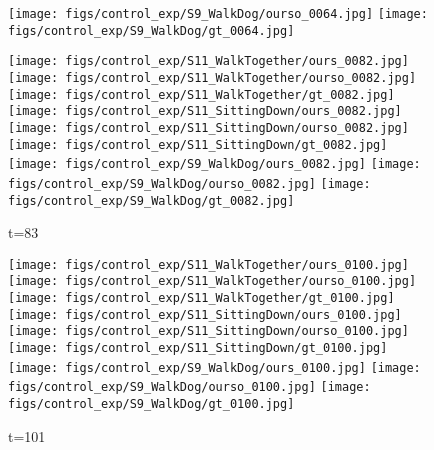 \documentclass{article}
\begin{document}
\begin{appendix}
\begin{figure*}[!thbp]
\begin{subfigure}{0.12\linewidth}
  		\texttt{[image: figs/control\_exp/S9\_WalkDog/ourso\_0064.jpg]}
  		\vspace{.2cm}
  		\texttt{[image: figs/control\_exp/S9\_WalkDog/gt\_0064.jpg]}
	\end{subfigure}
	\begin{subfigure}{0.12\linewidth}
        \caption*{t=83}
        \vspace{-7pt}
	    \texttt{[image: figs/control\_exp/S11\_WalkTogether/ours\_0082.jpg]}
	    \texttt{[image: figs/control\_exp/S11\_WalkTogether/ourso\_0082.jpg]}
	    \vspace{.2cm}
  		\texttt{[image: figs/control\_exp/S11\_WalkTogether/gt\_0082.jpg]}
  		\texttt{[image: figs/control\_exp/S11\_SittingDown/ours\_0082.jpg]}
  		\texttt{[image: figs/control\_exp/S11\_SittingDown/ourso\_0082.jpg]}
  		\vspace{.2cm}
  		\texttt{[image: figs/control\_exp/S11\_SittingDown/gt\_0082.jpg]}
  		\texttt{[image: figs/control\_exp/S9\_WalkDog/ours\_0082.jpg]}
  		\texttt{[image: figs/control\_exp/S9\_WalkDog/ourso\_0082.jpg]}
  		\vspace{.2cm}
  		\texttt{[image: figs/control\_exp/S9\_WalkDog/gt\_0082.jpg]}
	\end{subfigure}
	\begin{subfigure}{0.12\linewidth}
        \caption*{t=101}
        \vspace{-7pt}
	    \texttt{[image: figs/control\_exp/S11\_WalkTogether/ours\_0100.jpg]}
	    \texttt{[image: figs/control\_exp/S11\_WalkTogether/ourso\_0100.jpg]}
	    \vspace{.2cm}
  		\texttt{[image: figs/control\_exp/S11\_WalkTogether/gt\_0100.jpg]}
  		\texttt{[image: figs/control\_exp/S11\_SittingDown/ours\_0100.jpg]}
  		\texttt{[image: figs/control\_exp/S11\_SittingDown/ourso\_0100.jpg]}
  		\vspace{.2cm}
  		\texttt{[image: figs/control\_exp/S11\_SittingDown/gt\_0100.jpg]}
  		\texttt{[image: figs/control\_exp/S9\_WalkDog/ours\_0100.jpg]}
  		\texttt{[image: figs/control\_exp/S9\_WalkDog/ourso\_0100.jpg]}
  		\vspace{.2cm}
  		\texttt{[image: figs/control\_exp/S9\_WalkDog/gt\_0100.jpg]}
	\end{subfigure}

\end{figure*}
\end{appendix}
\end{document}

